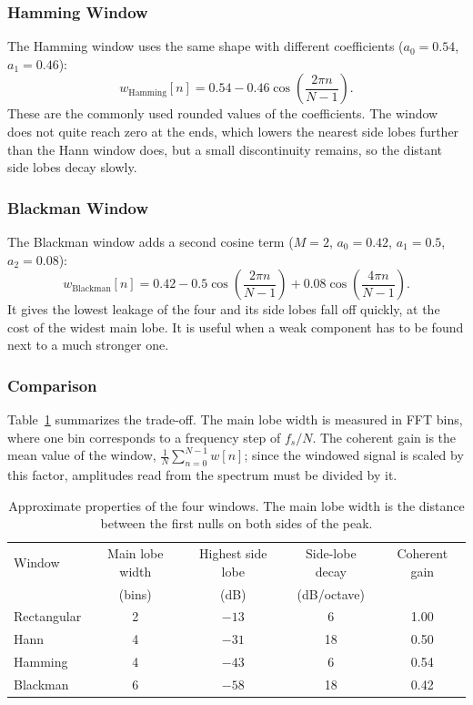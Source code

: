 \subsubsection{Hamming Window}

The Hamming window uses the same shape with different coefficients
($a_0=0.54$, $a_1=0.46$):
\begin{equation}
  w_{\mathrm{Hamming}}[n] = 0.54 - 0.46 \cos\!\left( \frac{2\pi n}{N-1} \right).
  \label{eq:hamming}
\end{equation}
These are the commonly used rounded values of the coefficients. The window
does not quite reach zero at the ends, which lowers the nearest side lobes
further than the Hann window does, but a small discontinuity remains, so the
distant side lobes decay slowly.

\subsubsection{Blackman Window}

The Blackman window adds a second cosine term ($M=2$, $a_0=0.42$,
$a_1=0.5$, $a_2=0.08$):
\begin{equation}
  w_{\mathrm{Blackman}}[n] = 0.42 - 0.5 \cos\!\left( \frac{2\pi n}{N-1} \right)
  + 0.08 \cos\!\left( \frac{4\pi n}{N-1} \right).
  \label{eq:blackman}
\end{equation}
It gives the lowest leakage of the four and its side lobes fall off quickly,
at the cost of the widest main lobe. It is useful when a weak component has to
be found next to a much stronger one.

\subsubsection{Comparison}

Table~\ref{tab:windows} summarizes the trade-off. The main lobe width is
measured in FFT bins, where one bin corresponds to a frequency step of
$f_s/N$. The coherent gain is the mean value of the window,
$\frac{1}{N}\sum_{n=0}^{N-1} w[n]$; since the windowed signal is scaled by
this factor, amplitudes read from the spectrum must be divided by it.
\begin{table}[htbp]
  \centering
  \small
  \begin{tabular}{lcccc}
    \toprule
    Window & Main lobe width & Highest side lobe & Side-lobe decay & Coherent gain \\
           & (bins)          & (dB)              & (dB/octave)     &               \\
    \midrule
    Rectangular & 2 & $-13$ & 6  & 1.00 \\
    Hann        & 4 & $-31$ & 18 & 0.50 \\
    Hamming     & 4 & $-43$ & 6  & 0.54 \\
    Blackman    & 6 & $-58$ & 18 & 0.42 \\
    \bottomrule
  \end{tabular}
  \caption{Approximate properties of the four windows. The main lobe width is
  the distance between the first nulls on both sides of the peak.}
  \label{tab:windows}
\end{table}
